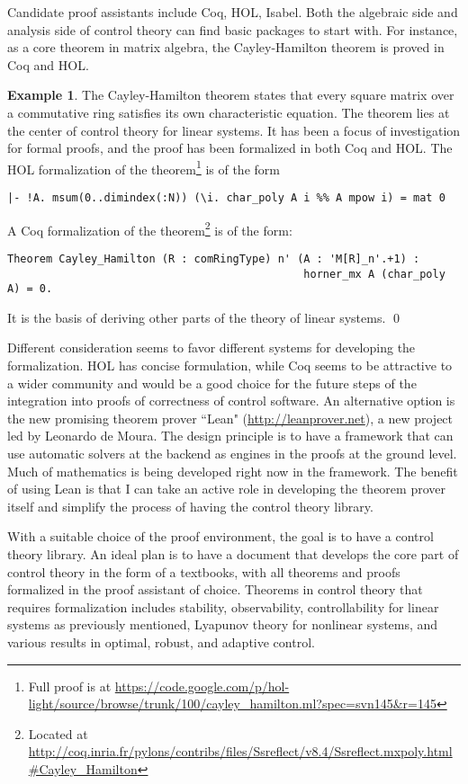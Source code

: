 \documentclass[10pt]{article}
\theoremstyle{definition}
\newtheorem{example}{Example}[section]
\begin{document}
Candidate proof assistants include Coq, HOL, Isabel. Both the algebraic side and analysis side of control theory can find basic packages to start with. For instance, as a core theorem in matrix algebra, the Cayley-Hamilton theorem is proved in Coq and HOL.  
\begin{example}
The Cayley-Hamilton theorem states that every square matrix over a commutative ring satisfies its own characteristic equation. The theorem lies at the center of control theory for linear systems. It has been a focus of investigation for formal proofs, and the proof has been formalized in both Coq and HOL. 
The HOL formalization of the theorem\footnote{Full proof is at \url{https://code.google.com/p/hol-light/source/browse/trunk/100/cayley_hamilton.ml?spec=svn145&r=145}} is of the form
\begin{verbatim}
|- !A. msum(0..dimindex(:N)) (\i. char_poly A i %% A mpow i) = mat 0
\end{verbatim}
A Coq formalization of the theorem\footnote{Located at \url{http://coq.inria.fr/pylons/contribs/files/Ssreflect/v8.4/Ssreflect.mxpoly.html\#Cayley_Hamilton}} is of the form:
\begin{verbatim}
Theorem Cayley_Hamilton (R : comRingType) n' (A : 'M[R]_n'.+1) : 
                                              horner_mx A (char_poly A) = 0.
\end{verbatim}
It is the basis of deriving other parts of the theory of linear systems. \qed
\end{example}
Different consideration seems to favor different systems for developing the formalization. HOL has concise formulation, while Coq seems to be attractive to a wider community and would be a good choice for the future steps of the integration into proofs of correctness of control software. An alternative option is the new promising theorem prover ``Lean" (\url{http://leanprover.net}), a new project led by Leonardo de Moura. The design principle is to have a framework that can use automatic solvers at the backend as engines in the proofs at the ground level. Much of mathematics is being developed right now in the framework. The benefit of using Lean is that I can take an active role in developing the theorem prover itself and simplify the process of having the control theory library. 

With a suitable choice of the proof environment, the goal is to have a control theory library. An ideal plan is to have a document that develops the core part of control theory in the form of a textbooks, with all theorems and proofs formalized in the proof assistant of choice. Theorems in control theory that requires formalization includes stability, observability, controllability for linear systems as previously mentioned, Lyapunov theory for nonlinear systems, and various results in optimal, robust, and adaptive control. 
\end{document}
